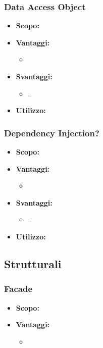     
   \subsubsection{Data Access Object}
      \begin{itemize}
       \item \textbf{Scopo:}
	\item \textbf{Vantaggi:}
	  \begin{itemize}
	   \item 
	  \end{itemize}
	\item \textbf{Svantaggi:}
	  \begin{itemize}
	   \item .
	  \end{itemize}
	\item \textbf{Utilizzo:}
	\end{itemize}
	
    \subsubsection{Dependency Injection?}
     \begin{itemize}
       \item \textbf{Scopo:}
	\item \textbf{Vantaggi:}
	  \begin{itemize}
	   \item 
	  \end{itemize}
	\item \textbf{Svantaggi:}
	  \begin{itemize}
	   \item .
	  \end{itemize}
	\item \textbf{Utilizzo:}
	\end{itemize}
  
  \subsection{Strutturali}
  
    \subsubsection{Facade}
      \begin{itemize}
       \item \textbf{Scopo:}
	\item \textbf{Vantaggi:}
	  \begin{itemize}
	   \item 
	  \end{itemize}
	\item \textbf{Svantaggi:}
	  \begin{itemize}
	   \item .
	  \end{itemize}
	\item \textbf{Utilizzo:}
	\end{itemize}
	
